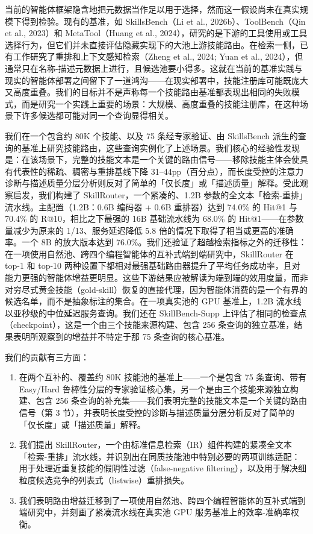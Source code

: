 \documentclass[11pt,UTF8,fontset=fandol]{ctexart}
\makeatletter
\newcommand{\Hit}{Hit@1}
\makeatother
\begin{document}
当前的智能体框架隐含地把元数据当作足以用于选择，然而这一假设尚未在真实规模下得到检验。现有的基准，如 SkillsBench（Li et al., 2026b）、ToolBench（Qin et al., 2023）和 MetaTool（Huang et al., 2024），研究的是下游的工具使用或工具选择行为，但它们并未直接评估隐藏实现下的大池上游技能路由。在检索一侧，已有工作研究了重排和上下文感知检索（Zheng et al., 2024; Yuan et al., 2024），但通常只在名称-描述元数据上进行，且候选池要小得多。这就在当前的基准实践与现实的智能体部署之间留下了一道鸿沟——在现实部署中，技能注册库可能既庞大又高度重叠。我们的目标并不是声称每一个技能路由基准都表现出相同的失败模式，而是研究一个实践上重要的场景：大规模、高度重叠的技能注册库，在这种场景下许多候选都可能对同一个查询显得相关。

我们在一个包含约 80K 个技能、以及 75 条经专家验证、由 SkillsBench 派生的查询的基准上研究技能路由，这些查询实例化了上述场景。我们核心的经验性发现是：在该场景下，完整的技能文本是一个关键的路由信号——移除技能主体会使具有代表性的稀疏、稠密与重排基线下降 31--44pp（百分点），而长度受控的注意力诊断与描述质量分层分析则反对了简单的「仅长度」或「描述质量」解释。受此观察启发，我们构建了 SkillRouter，一个紧凑的、1.2B 参数的全文本「检索-重排」流水线。主配置（1.2B：0.6B 编码器 + 0.6B 重排器）达到 74.0\% 的 \Hit{} 与 70.4\% 的 R@10，相比之下最强的 16B 基础流水线为 68.0\% 的 \Hit{}——在参数量减少为原来的 1/13、服务延迟降低 5.8 倍的情况下取得了相当或更高的准确率。一个 8B 的放大版本达到 76.0\%。我们还验证了超越检索指标之外的迁移性：在一项使用自然池、跨四个编程智能体的互补式端到端研究中，SkillRouter 在 top-1 和 top-10 两种设置下都相对最强基础路由器提升了平均任务成功率，且对能力更强的智能体增益更明显。这些下游结果应被解读为端到端的效用度量，而非对穷尽式黄金技能（gold-skill）恢复的直接代理，因为智能体消费的是一个有界的候选名单，而不是抽象标注的集合。在一项真实池的 GPU 基准上，1.2B 流水线以亚秒级的中位延迟服务查询。我们还在 SkillBench-Supp 上评估了相同的检查点（checkpoint），这是一个由三个技能来源构建、包含 256 条查询的独立基准，结果表明所观察到的增益并不特定于那 75 条查询的核心基准。

我们的贡献有三方面：

\begin{enumerate}[leftmargin=2em]
\item 在两个互补的、覆盖约 80K 技能池的基准上——一个是包含 75 条查询、带有 Easy/Hard 鲁棒性分层的专家验证核心集，另一个是由三个技能来源独立构建、包含 256 条查询的补充集——我们表明完整的技能文本是一个关键的路由信号（第 3 节），并表明长度受控的诊断与描述质量分层分析反对了简单的「仅长度」或「描述质量」解释。
\item 我们提出 SkillRouter，一个由标准信息检索（IR）组件构建的紧凑全文本「检索-重排」流水线，并识别出在同质技能池中特别必要的两项训练适配：用于处理近重复技能的假阴性过滤（false-negative filtering），以及用于解决细粒度候选竞争的列表式（listwise）重排损失。
\item 我们表明路由增益迁移到了一项使用自然池、跨四个编程智能体的互补式端到端研究中，并刻画了紧凑流水线在真实池 GPU 服务基准上的效率-准确率权衡。
\end{enumerate}
\end{document}
